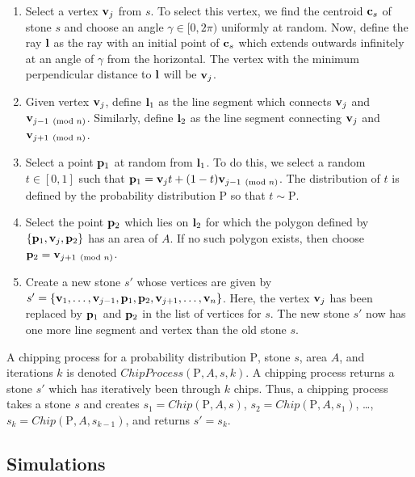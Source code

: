 \begin{enumerate}
  \item Select a vertex $\mathbf{v}_j$ from $s$. To select this vertex, we find the centroid $\mathbf{c}_s$ of stone $s$ and choose an angle $\gamma \in [0, 2\pi)$ uniformly at random. Now, define the ray $\mathbf{l}$ as the ray with an initial point of $\mathbf{c}_s$ which extends outwards infinitely at an angle of $\gamma$ from the horizontal. The vertex with the minimum perpendicular distance to $\mathbf{l}$ will be $\mathbf{v}_j$.
  \item Given vertex $\mathbf{v}_j$, define $\mathbf{l}_1$ as the line segment which connects $\mathbf{v}_j$ and $\mathbf{v}_{{j-1} \pmod{n}}$. Similarly, define $\mathbf{l}_2$ as the line segment connecting $\mathbf{v}_j$ and $\mathbf{v}_{{j+1} \pmod{n}}$.
  \item Select a point $\mathbf{p}_1$ at random from $\mathbf{l}_1$. To do this, we select a random $t \in [0,1]$ such that $\mathbf{p}_1 = \mathbf{v}_j t + (1-t) \mathbf{v}_{{j-1} \pmod{n}}$. The distribution of $t$ is defined by the probability distribution $\mathrm{P}$ so that $t \sim \mathrm{P}$.
  \item Select the point $\mathbf{p}_2$ which lies on $\mathbf{l}_2$ for which the polygon defined by $\{\mathbf{p}_1, \mathbf{v}_j, \mathbf{p}_2\}$ has an area of $A$. If no such polygon exists, then choose $\mathbf{p}_2 = \mathbf{v}_{{j+1} \pmod{n}}$.
  \item Create a new stone $s'$ whose vertices are given by $s' = \{ \mathbf{v}_1, \ldots, \mathbf{v}_{j-1}, \mathbf{p}_1, \mathbf{p}_2, \mathbf{v}_{j+1}, \ldots, \mathbf{v}_n \}$. Here, the vertex $\mathbf{v}_j$ has been replaced by $\mathbf{p}_1$ and $\mathbf{p}_2$ in the list of vertices for $s$. The new stone $s'$ now has one more line segment and vertex than the old stone $s$.
\end{enumerate}

A chipping process for a probability distribution $\mathrm{P}$, stone $s$, area $A$, and iterations $k$ is denoted $ChipProcess(\mathrm{P}, A, s, k)$. A chipping process returns a stone $s'$ which has iteratively been through $k$ chips. Thus, a chipping process takes a stone $s$ and creates $s_1 = Chip(\mathrm{P}, A, s)$, $s_2 = Chip(\mathrm{P}, A, s_1)$, \ldots, $s_k = Chip(\mathrm{P}, A, s_{k-1})$, and returns $s' = s_k$.

\subsection{Simulations}

